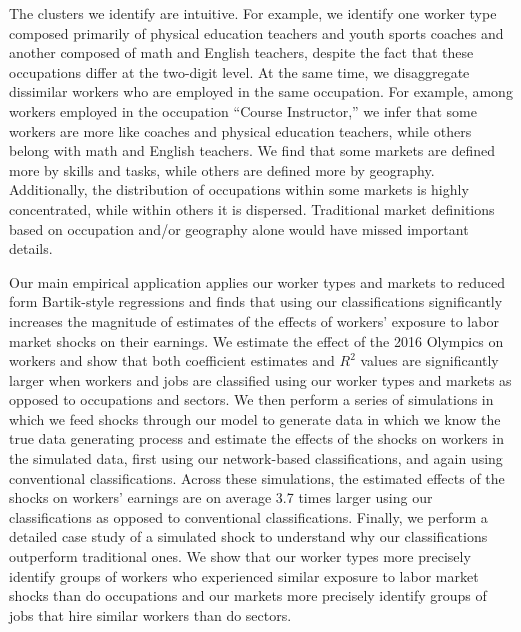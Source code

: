 \documentclass[12pt]{article}
\theoremstyle{definition}
\theoremstyle{plain}
\begin{document}
The clusters we identify are intuitive. For example, we identify one worker type composed primarily of physical education teachers and youth sports coaches and another composed of math and English teachers, despite the fact that these occupations differ at the two-digit level. At the same time, we disaggregate dissimilar workers who are employed in the same occupation. For example, among workers employed in the occupation “Course Instructor,” we infer that some workers are more like coaches and physical education teachers, while others belong with math and English teachers. We find that some markets are defined more by skills and tasks, while others are defined more by geography. Additionally, the distribution of occupations within some markets is highly concentrated, while within others it is dispersed. Traditional market definitions based on occupation and/or geography alone would have missed important details. 


Our main empirical application applies our worker types and markets to reduced form Bartik-style regressions and finds that using our classifications significantly increases the magnitude of estimates of the effects of workers' exposure to labor market shocks on their earnings. We estimate the effect of the 2016 Olympics on workers and show that both coefficient estimates and $R^2$ values are significantly larger when workers and jobs are classified using our worker types and markets as opposed to occupations and sectors. We then perform a series of simulations in which we feed shocks through our model to generate data in which we know the true data generating process and estimate the effects of the shocks on workers in the simulated data, first using our network-based classifications, and again using conventional classifications. Across these simulations, the estimated effects of the shocks on workers' earnings are on average 3.7 times larger using our classifications as opposed to conventional classifications. Finally, we perform a detailed case study of a simulated shock to understand why our classifications outperform traditional ones. We show that our worker types more precisely identify groups of workers who experienced similar exposure to labor market shocks than do occupations and our markets more precisely identify groups of jobs that hire similar workers than do sectors. 
\end{document}
